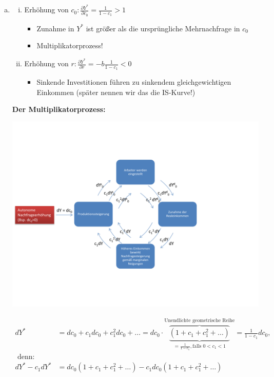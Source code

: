 \documentclass{scrartcl}
\begin{document}
\begin{enumerate}[(a)]
\item
\begin{enumerate}[(i)]
  \item Erh\"{o}hung von $c_{0}: \frac{\partial Y^*}{\partial c_{0}}=\frac{1}{1-c_1}>1$
  \begin{itemize}
    \item Zunahme in $Y^*$ ist gr\"{o}{\ss}er als die urspr\"{u}ngliche Mehrnachfrage in $c_{0}$
    \item Multiplikatorprozess!
  \end{itemize}
  \item Erh\"{o}hung von $r: \frac{\partial Y^*}{\partial r}=-b\frac{1}{1-c_1}<0$
  \begin{itemize}
    \item Sinkende Investitionen f\"{u}hren zu sinkendem gleichgewichtigen Einkommen (sp\"{a}ter nennen wir das die IS-Kurve!)
  \end{itemize}
\end{enumerate}
\textbf{Der Multiplikatorprozess:}
\begin{center}
  \includegraphics[width=\textwidth]{Bilder/multiplikator.pdf}
\end{center}
\begin{align*}
  d Y^* &= d c_{0} + c_1 d c_{0} + c_1^2 d c_{0} + \dots = d c_{0} \cdot \overbrace{\underbrace{(1 + c_1 + c_1^2+ \dots)}}_{=\frac{1}{1-c_1}, \text{falls } 0<c_1<1}^\text{Unendlichte geometrische Reihe}= \frac{1}{1-c_1}dc_{0}, \\\text{ denn:}&\\
  d Y^* - c_1 d Y^* &= d c_{0}(1 + c_1 + c_1^2+ \dots) - c_1 d c_{0}(1 + c_1 + c_1^2+ \dots) \\

\end{align*}
\end{enumerate}
\end{document}

